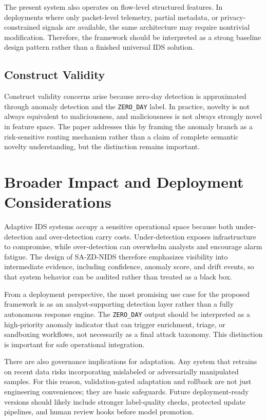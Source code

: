 \documentclass[conference]{IEEEtran}
\begin{document}
The present system also operates on flow-level structured features. In deployments where only packet-level telemetry, partial metadata, or privacy-constrained signals are available, the same architecture may require nontrivial modification. Therefore, the framework should be interpreted as a strong baseline design pattern rather than a finished universal IDS solution.

\subsection{Construct Validity}
Construct validity concerns arise because zero-day detection is approximated through anomaly detection and the \texttt{ZERO\_DAY} label. In practice, novelty is not always equivalent to maliciousness, and maliciousness is not always strongly novel in feature space. The paper addresses this by framing the anomaly branch as a risk-sensitive routing mechanism rather than a claim of complete semantic novelty understanding, but the distinction remains important.

\section{Broader Impact and Deployment Considerations}
Adaptive IDS systems occupy a sensitive operational space because both under-detection and over-detection carry costs. Under-detection exposes infrastructure to compromise, while over-detection can overwhelm analysts and encourage alarm fatigue. The design of SA-ZD-NIDS therefore emphasizes visibility into intermediate evidence, including confidence, anomaly score, and drift events, so that system behavior can be audited rather than treated as a black box.

From a deployment perspective, the most promising use case for the proposed framework is as an analyst-supporting detection layer rather than a fully autonomous response engine. The \texttt{ZERO\_DAY} output should be interpreted as a high-priority anomaly indicator that can trigger enrichment, triage, or sandboxing workflows, not necessarily as a final attack taxonomy. This distinction is important for safe operational integration.

There are also governance implications for adaptation. Any system that retrains on recent data risks incorporating mislabeled or adversarially manipulated samples. For this reason, validation-gated adaptation and rollback are not just engineering conveniences; they are basic safeguards. Future deployment-ready versions should likely include stronger label-quality checks, protected update pipelines, and human review hooks before model promotion.
\end{document}
